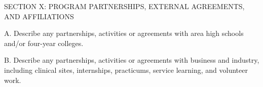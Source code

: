 SECTION X: PROGRAM PARTNERSHIPS, EXTERNAL AGREEMENTS, AND AFFILIATIONS


A. Describe any partnerships, activities or agreements with area high schools and/or four-year colleges.




B. Describe any partnerships, activities or agreements with business and industry, including clinical sites, internships, practicums, service learning, and volunteer work.
